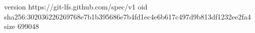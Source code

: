 version https://git-lfs.github.com/spec/v1
oid sha256:302036226269768e7b1b395686e7b4fd1ec4e6b617c497d9b813df1232ee2fa4
size 699048
